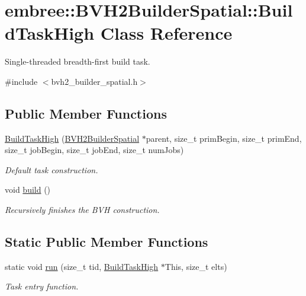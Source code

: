 \hypertarget{classembree_1_1_b_v_h2_builder_spatial_1_1_build_task_high}{
\section{embree::BVH2BuilderSpatial::BuildTaskHigh Class Reference}
\label{classembree_1_1_b_v_h2_builder_spatial_1_1_build_task_high}
}


Single-\/threaded breadth-\/first build task.  




{\ttfamily \#include $<$bvh2\_\-builder\_\-spatial.h$>$}

\subsection*{Public Member Functions}
\begin{DoxyCompactItemize}
\item 
\hyperlink{classembree_1_1_b_v_h2_builder_spatial_1_1_build_task_high_a07b27aa14434e0463b91691b336451bd}{BuildTaskHigh} (\hyperlink{classembree_1_1_b_v_h2_builder_spatial}{BVH2BuilderSpatial} $\ast$parent, size\_\-t primBegin, size\_\-t primEnd, size\_\-t jobBegin, size\_\-t jobEnd, size\_\-t numJobs)
\begin{DoxyCompactList}\small\item\em Default task construction. \item\end{DoxyCompactList}\item 
void \hyperlink{classembree_1_1_b_v_h2_builder_spatial_1_1_build_task_high_ab0a9e4ac89521be9f67bf37cfecbb8ee}{build} ()
\begin{DoxyCompactList}\small\item\em Recursively finishes the BVH construction. \item\end{DoxyCompactList}\end{DoxyCompactItemize}
\subsection*{Static Public Member Functions}
\begin{DoxyCompactItemize}
\item 
static void \hyperlink{classembree_1_1_b_v_h2_builder_spatial_1_1_build_task_high_a1fc882d47f68a11ba1f84f4ab04d01c5}{run} (size\_\-t tid, \hyperlink{classembree_1_1_b_v_h2_builder_spatial_1_1_build_task_high}{BuildTaskHigh} $\ast$This, size\_\-t elts)
\begin{DoxyCompactList}\small\item\em Task entry function. \item\end{DoxyCompactList}\end{DoxyCompactItemize}


